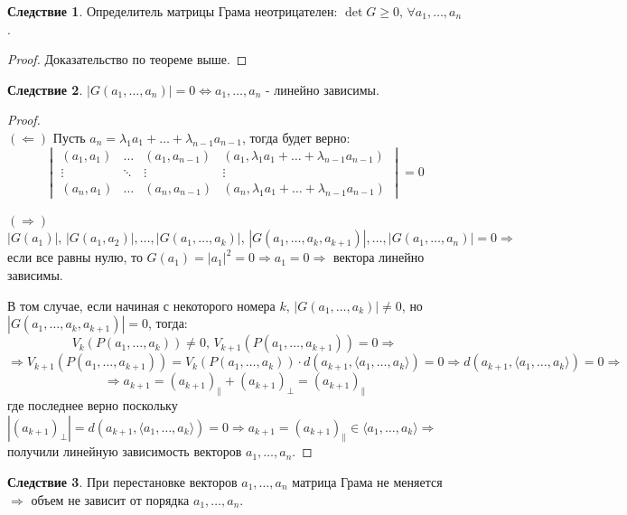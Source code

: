\documentclass[12pt]{article}
\theoremstyle{definition}
\newtheorem{corollary}{Следствие}
\begin{document}
\begin{corollary}
	Определитель матрицы Грама неотрицателен: $\det{G} \geq 0, \, \forall a_1, \dotsc, a_n$.
\end{corollary}
\begin{proof}
	Доказательство по теореме выше.
\end{proof}
\begin{corollary}
	$|G(a_1, \dotsc, a_n)| = 0 \Leftrightarrow a_1, \dotsc, a_n$ - линейно зависимы.
\end{corollary}
\begin{proof}\hfill\\
	$(\Leftarrow)$ Пусть $a_n = \lambda_1 a_1 + \dotsc + \lambda_{n-1} a_{n-1}$, тогда будет верно:
	$$
		\begin{vmatrix}
			(a_1,a_1) & \dotsc & (a_1, a_{n-1}) & (a_1, \lambda_1 a_1 + \dotsc + \lambda_{n-1} a_{n-1}) \\
			\vdots & \ddots & \vdots & \vdots \\
			(a_n,a_1) & \dotsc & (a_n, a_{n-1}) & (a_n, \lambda_1 a_1 + \dotsc + \lambda_{n-1} a_{n-1})
		\end{vmatrix} = 0
	$$
	
	$(\Rightarrow)$ $|G(a_1)|, \, |G(a_1,a_2)|, \dotsc, |G(a_1, \dotsc, a_k)|, \, |G(a_1, \dotsc, a_k, a_{k+1})|, \dotsc, |G(a_1, \dotsc, a_n)| = 0 \Rightarrow$ если все равны нулю, то $G(a_1) = |a_1|^2 = 0 \Rightarrow a_1 = 0 \Rightarrow$ вектора линейно зависимы. 
	
	В том случае, если начиная с некоторого номера $k, \, |G(a_1, \dotsc, a_k)| \neq 0$, но $|G(a_1, \dotsc, a_k, a_{k+1})| = 0$, тогда:
	$$
 		V_k(P(a_1, \dotsc, a_k)) \neq 0, \, V_{k+1}(P(a_1, \dotsc, a_{k+1})) = 0 \Rightarrow
	$$	
	$$	
		\Rightarrow V_{k+1}(P(a_1, \dotsc, a_{k+1})) = V_k(P(a_1,\dotsc, a_k)){\cdot}d(a_{k+1},\langle a_1, \dotsc, a_k \rangle) = 0 \Rightarrow d(a_{k+1}, \langle a_1, \dotsc, a_k \rangle) = 0 \Rightarrow
	$$
	$$
		\Rightarrow a_{k+1} = (a_{k+1})_{\|} + (a_{k+1})_{\bot} = (a_{k+1})_{\|}
	$$
	где последнее верно поскольку $|(a_{k+1})_\bot| = d(a_{k+1},\langle a_1, \dotsc, a_k \rangle ) = 0 \Rightarrow a_{k+1} = (a_{k+1})_{\|} \in \langle a_1, \dotsc, a_k \rangle \Rightarrow$ получили линейную зависимость векторов $a_1, \dotsc, a_n$.
\end{proof}

\begin{corollary}
	При перестановке векторов $a_1, \dotsc, a_n$ матрица Грама не меняется $\Rightarrow$ объем не зависит от порядка $a_1, \dotsc, a_n$.
\end{corollary}
\end{document}

